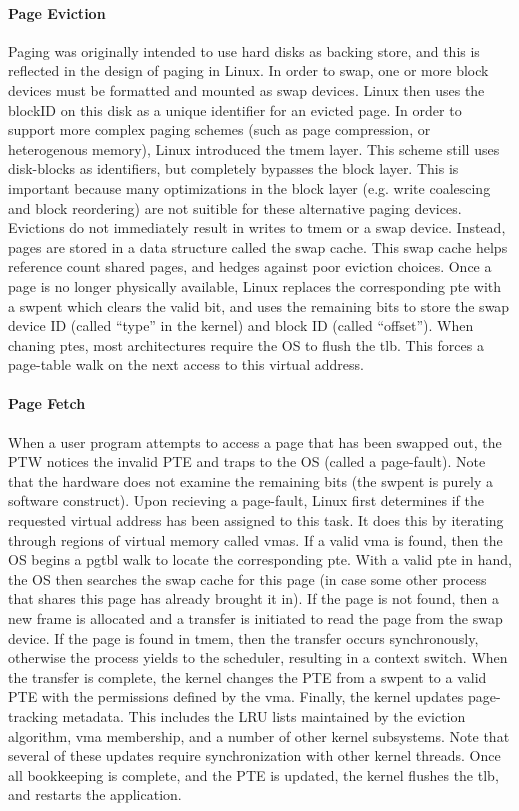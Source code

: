 \paragraph{Page Eviction}
Paging was originally intended to use hard disks as backing store, and this
is reflected in the design of paging in Linux. In order to swap, one or more
block devices must be formatted and mounted as swap devices. Linux then uses
the blockID on this disk as a unique identifier for an evicted page. In order
to support more complex paging schemes (such as page compression, or
heterogenous memory), Linux introduced the \gls{tmem} layer\cite{tmem}. This
scheme still uses disk-blocks as identifiers, but completely bypasses the
block layer. This is important because many optimizations in the block layer
(e.g. write coalescing and block reordering) are not suitible for these
alternative paging devices. Evictions do not immediately result in writes to
\gls{tmem} or a swap device. Instead, pages are stored in a data structure
called the swap cache. This swap cache helps reference count shared pages, and
hedges against poor eviction choices. Once a page is no longer physically
available, Linux replaces the corresponding \gls{pte} with a \gls{swpent}
which clears the valid bit, and uses the remaining bits to store the swap
device ID (called ``type'' in the kernel) and block ID (called ``offset'').
When chaning \glspl{pte}, most architectures require the OS to flush the
\gls{tlb}. This forces a page-table walk on the next access to this virtual
address.

\paragraph{Page Fetch}
When a user program attempts to access a page that has been swapped out, the
PTW notices the invalid PTE and traps to the OS (called a page-fault). Note
that the hardware does not examine the remaining bits (the \gls{swpent} is
purely a software construct). Upon recieving a page-fault, Linux first
determines if the requested virtual address has been assigned to this task. It
does this by iterating through regions of virtual memory called \glspl{vma}. If
a valid \gls{vma} is found, then the OS begins a \gls{pgtbl} walk to locate the
corresponding \gls{pte}. With a valid \gls{pte} in hand, the OS then searches
the swap cache for this page (in case some other process that shares this page
has already brought it in). If the page is not found, then a new frame is
allocated and a transfer is initiated to read the page from the swap device. If
the page is found in \gls{tmem}, then the transfer occurs synchronously,
otherwise the process yields to the scheduler, resulting in a context switch. When
the transfer is complete, the kernel changes the PTE from a \gls{swpent} to a
valid PTE with the permissions defined by the \gls{vma}. Finally, the kernel
updates page-tracking metadata. This includes the LRU lists maintained by the
eviction algorithm, \gls{vma} membership, and a number of other kernel
subsystems. Note that several of these updates require synchronization with
other kernel threads. Once all bookkeeping is complete, and the PTE is updated,
the kernel flushes the \gls{tlb}, and restarts the application.
 
